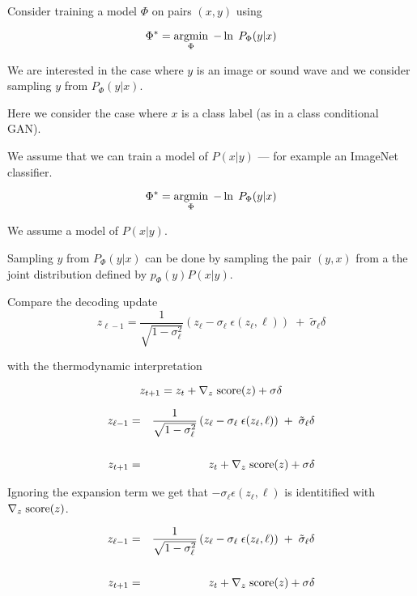 {

Consider training a model $\Phi$ on pairs $(x,y)$ using

$$\Phi^* = \operatorname*{argmin}_\Phi\;-\ln\;P_\Phi(y|x)$$

\vfill
We are interested in the case where $y$ is an image or sound wave and we consider sampling $y$ from $P_\Phi(y|x)$.

\vfill
Here we consider the case where $x$ is a class label (as in a class conditional GAN).

\vfill
We assume that we can train a model of $P(x|y)$  --- for example an ImageNet classifier.


$$\Phi^* = \operatorname*{argmin}_\Phi\;-\ln\;P_\Phi(y|x)$$

\vfill
We assume a model of $P(x|y)$.

\vfill
Sampling $y$ from $P_\Phi(y|x)$ can be done by sampling the pair $(y,x)$ from a the joint distribution defined by $p_\Phi(y)P(x|y)$.


Compare the decoding update
$$z_{\ell-1} = \frac{1}{\sqrt{1-\sigma_\ell^2}}\left(z_\ell - \sigma_\ell\; \epsilon(z_\ell,\ell) \right)\; +\; \tilde{\sigma}_\ell\delta$$

\vfill
with the thermodynamic interpretation

$$z_{t+1} = z_t + \nabla_z \;\mathrm{score}(z) + \sigma \delta$$


\begin{eqnarray*}
  z_{\ell-1} & = & \frac{1}{\sqrt{1-\sigma_\ell^2}}\left(z_\ell - \sigma_\ell\; \epsilon(z_\ell,\ell) \right)\; +\; \tilde{\sigma}_\ell\delta \\
  \\
  z_{t+1} & = & z_t + \nabla_z\; \mathrm{score}(z) + \sigma \delta
\end{eqnarray*}


\vfill
Ignoring the expansion term we get that $- \sigma_\ell \epsilon(z_\ell,\ell)$ is identitified with $\nabla_z\; \mathrm{score}(z)$.

\begin{eqnarray*}
  z_{\ell-1} & = & \frac{1}{\sqrt{1-\sigma_\ell^2}}\left(z_\ell - \sigma_\ell\; \epsilon(z_\ell,\ell) \right)\; +\; \tilde{\sigma}_\ell\delta \\
  \\
  z_{t+1} & = & z_t + \nabla_z\; \mathrm{score}(z) + \sigma \delta
\end{eqnarray*}


}

